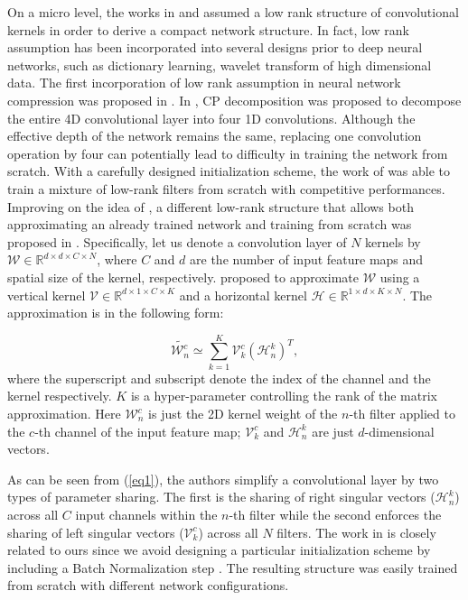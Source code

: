 \documentclass[conference,usletter]{IEEEtran}
\begin{document}
On a micro level, the works in \cite{tai2015convolutional} and \cite{ioannou2015training} assumed a low rank structure of convolutional kernels in order to derive a compact network structure. In fact, low rank assumption has been incorporated into several designs prior to deep neural networks, such as dictionary learning, wavelet transform of high dimensional data. The first incorporation of low rank assumption in neural network compression was proposed in \cite{jaderberg2014speeding,lebedev2014speeding, denton2014exploiting}. In \cite{lebedev2014speeding}, CP decomposition was proposed to decompose the entire 4D convolutional layer into four 1D convolutions. Although the effective depth of the network remains the same, replacing one convolution operation by four can potentially lead to difficulty in training the network from scratch. With a carefully designed initialization scheme, the work of \cite{ioannou2015training} was able to train a mixture of low-rank filters from scratch with competitive performances. Improving on the idea of \cite{lebedev2014speeding}, a different low-rank structure that allows both approximating an already trained network and training from scratch was proposed in \cite{tai2015convolutional}. Specifically, let us denote a convolution layer of $N$ kernels by $\mathcal{W} \in \mathbb{R}^{d\times d\times C\times N}$, where $C$ and $d$ are the number of input feature maps and spatial size of the kernel, respectively. \cite{tai2015convolutional} proposed to approximate $\mathcal{W}$ using a vertical kernel $\mathcal{V} \in \mathbb{R}^{d\times 1\times C\times K}$ and a horizontal kernel $\mathcal{H} \in \mathbb{R}^{1\times d\times K\times N}$. The approximation is in the following form:

\begin{equation}\label{eq1}
\tilde{\mathcal{W}^{c}_{n}} \simeq \sum_{k=1}^{K}\mathcal{V}^{c}_{k}(\mathcal{H}^{k}_{n})^{T},
\end{equation}
where the superscript and subscript denote the index of the channel and the kernel respectively. $K$ is a hyper-parameter controlling the rank of the matrix approximation. Here $\mathcal{W}^{c}_{n}$ is just the 2D kernel weight of the $n$-th filter applied to the $c$-th channel of the input feature map; $\mathcal{V}^{c}_{k}$ and $\mathcal{H}^{k}_{n}$ are just $d$-dimensional vectors.

As can be seen from (\ref{eq1}), the authors simplify a convolutional layer by two types of parameter sharing. The first is the sharing of right singular vectors ($\mathcal{H}^{k}_{n}$) across all $C$ input channels within the $n$-th filter while the second enforces the sharing of left singular vectors ($\mathcal{V}^{c}_{k}$) across all $N$ filters. The work in \cite{tai2015convolutional} is closely related to ours since we avoid designing a particular initialization scheme by including a Batch Normalization step \cite{ioffe2015batch}. The resulting structure was easily trained from scratch with different network configurations.
\end{document}
